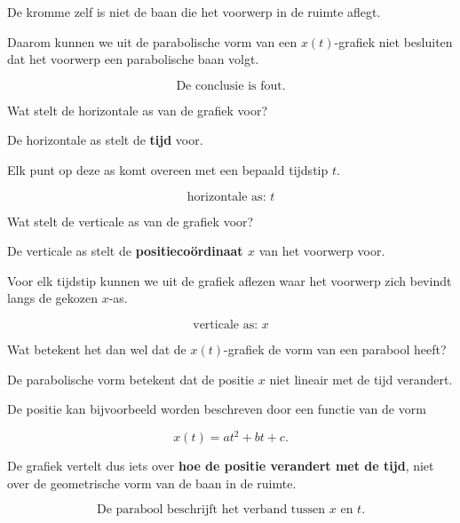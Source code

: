 \documentclass{ximera}
\begin{document}
\begin{oefening}{\oefU\ESS}
\begin{question}
\begin{oplossing}
  De kromme zelf is niet de baan die het voorwerp in de ruimte aflegt.
  
  Daarom kunnen we uit de parabolische vorm van een $x(t)$-grafiek niet
  besluiten dat het voorwerp een parabolische baan volgt.
  
  \[
  \boxed{\text{De conclusie is fout.}}
  \]
  \end{oplossing}
  \end{question}
  
  
  \begin{question}
  Wat stelt de horizontale as van de grafiek voor?
  
  \begin{oplossing}
  De horizontale as stelt de \textbf{tijd} voor.
  
  Elk punt op deze as komt overeen met een bepaald tijdstip $t$.
  
  \[
  \boxed{\text{horizontale as: }t}
  \]
  \end{oplossing}
  \end{question}
  
  
  \begin{question}
  Wat stelt de verticale as van de grafiek voor?
  
  \begin{oplossing}
  De verticale as stelt de \textbf{positiecoördinaat $x$} van het voorwerp
  voor.
  
  Voor elk tijdstip kunnen we uit de grafiek aflezen waar het voorwerp zich
  bevindt langs de gekozen $x$-as.
  
  \[
  \boxed{\text{verticale as: }x}
  \]
  \end{oplossing}
  \end{question}
  
  
  \begin{question}
  Wat betekent het dan wel dat de $x(t)$-grafiek de vorm van een parabool
  heeft?
  
  \begin{oplossing}
  De parabolische vorm betekent dat de positie $x$ niet lineair met de tijd
  verandert.
  
  De positie kan bijvoorbeeld worden beschreven door een functie van de vorm
  
  \[
  x(t)=at^2+bt+c.
  \]
  
  De grafiek vertelt dus iets over \textbf{hoe de positie verandert met de
  tijd}, niet over de geometrische vorm van de baan in de ruimte.
  
  \[
  \boxed{
  \text{De parabool beschrijft het verband tussen }x\text{ en }t.
  }
  \]
  \end{oplossing}
  \end{question}
  

\end{oefening}
\end{document}
